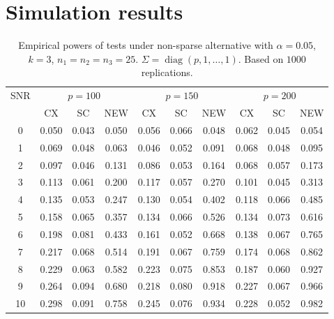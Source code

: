 \documentclass{beamer}
\DeclareMathOperator{\mydiag}{diag}
\theoremstyle{plain}
\theoremstyle{definition}
\theoremstyle{remark}
\begin{document}
\section{Simulation results}
\begin{frame}

\begin{table}[!hbp]\scriptsize
    \caption{Empirical powers of tests under non-sparse alternative with $\alpha=0.05$, $k=3$, $n_1=n_2=n_3=25$. $\Sigma=\mydiag(p,1,\ldots,1)$. Based on $1000$ replications.}
\centering
\begin{tabular}{*{10}{c}}
\toprule
\multirow{2}{*}{SNR} &\multicolumn{3}{c}{$p=100$}&\multicolumn{3}{c}{$p=150$}&\multicolumn{3}{c}{$p=200$} \\
    \cmidrule(r){2-4}\cmidrule(r){5-7}\cmidrule(r){8-10}
        & CX & SC & NEW & CX &SC &NEW &CX & SC & NEW\\
\midrule
0 & 0.050 & 0.043 & 0.050 & 0.056 & 0.066 & 0.048 & 0.062 & 0.045 & 0.054 \\ 
1 & 0.069 & 0.048 & 0.063 & 0.046 & 0.052 & 0.091 & 0.068 & 0.048 & 0.095 \\ 
2 & 0.097 & 0.046 & 0.131 & 0.086 & 0.053 & 0.164 & 0.068 & 0.057 & 0.173 \\ 
3 & 0.113 & 0.061 & 0.200 & 0.117 & 0.057 & 0.270 & 0.101 & 0.045 & 0.313 \\ 
4 & 0.135 & 0.053 & 0.247 & 0.130 & 0.054 & 0.402 & 0.118 & 0.066 & 0.485 \\ 
5 & 0.158 & 0.065 & 0.357 & 0.134 & 0.066 & 0.526 & 0.134 & 0.073 & 0.616 \\ 
6 & 0.198 & 0.081 & 0.433 & 0.161 & 0.052 & 0.668 & 0.138 & 0.067 & 0.765 \\ 
7 & 0.217 & 0.068 & 0.514 & 0.191 & 0.067 & 0.759 & 0.174 & 0.068 & 0.862 \\ 
8 & 0.229 & 0.063 & 0.582 & 0.223 & 0.075 & 0.853 & 0.187 & 0.060 & 0.927 \\ 
9 & 0.264 & 0.094 & 0.680 & 0.218 & 0.080 & 0.918 & 0.227 & 0.067 & 0.966 \\ 
10 & 0.298 & 0.091 & 0.758 & 0.245 & 0.076 & 0.934 & 0.228 & 0.052 & 0.982 \\ 
\bottomrule
\end{tabular}
\end{table}

\end{frame}
\end{document}
